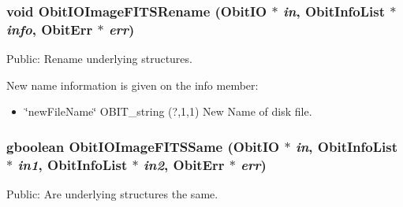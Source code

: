 \subsubsection{\setlength{\rightskip}{0pt plus 5cm}void Obit\-IOImage\-FITSRename ({\bf Obit\-IO} $\ast$ {\em in}, {\bf Obit\-Info\-List} $\ast$ {\em info}, {\bf Obit\-Err} $\ast$ {\em err})}\label{ObitIOImageFITS_8h_a7}


Public: Rename underlying structures. 

New name information is given on the info member: \begin{itemize}
\item \char`\"{}new\-File\-Name\char`\"{} OBIT\_\-string (?,1,1) New Name of disk file. 
\end{itemize}
\subsubsection{\setlength{\rightskip}{0pt plus 5cm}gboolean Obit\-IOImage\-FITSSame ({\bf Obit\-IO} $\ast$ {\em in}, {\bf Obit\-Info\-List} $\ast$ {\em in1}, {\bf Obit\-Info\-List} $\ast$ {\em in2}, {\bf Obit\-Err} $\ast$ {\em err})}\label{ObitIOImageFITS_8h_a6}


Public: Are underlying structures the same. 

